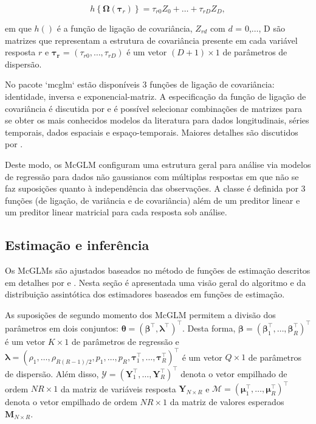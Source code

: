 \documentclass[AMA,STIX1COL]{WileyNJD-v2}
\begin{document}
\begin{equation}
h\left \{ \boldsymbol{\Omega}(\boldsymbol{\tau}_r) \right \} = \tau_{r0}Z_0 + \ldots + \tau_{rD}Z_D,
\end{equation}

em que $h()$ é a função de ligação de covariância, $Z_{rd}$ com $d$ = 0,$\ldots$, D são matrizes que representam a estrutura de covariância presente em cada variável resposta $r$ e $\boldsymbol{\tau_r}$ = $(\tau_{r0}, \ldots, \tau_{rD})$ é um vetor $(D + 1) \times 1$ de parâmetros de dispersão. 

No pacote `mcglm` estão disponíveis 3 funções de ligação de covariância: identidade, inversa e exponencial-matriz. A especificação da função de ligação de covariância é discutida por \citet{Pinheiro96} e é possível selecionar combinações de matrizes para se obter os mais conhecidos modelos da literatura para dados longitudinais, séries temporais, dados espaciais e espaço-temporais. Maiores detalhes são discutidos por \citet{Demidenko13}.

Deste modo, os McGLM configuram uma estrutura geral para análise via modelos de regressão para dados não gaussianos com múltiplas respostas em que não se faz suposições quanto à independência das observações. A classe é definida por 3 funções (de ligação, de variância e de covariância) além de um preditor linear e um preditor linear matricial para cada resposta sob análise. 

\subsection{Estimação e inferência}

Os McGLMs são ajustados baseados no método de funções de estimação descritos em detalhes por \citet{Bonat16} e \citet{jorg04}. Nesta seção é apresentada uma visão geral do algoritmo e da distribuição assintótica dos estimadores baseados em funções de estimação.

As suposições de segundo momento dos McGLM permitem a divisão dos
parâmetros em dois conjuntos: $\boldsymbol{\theta} = (\boldsymbol{\beta}^{\top}, \boldsymbol{\lambda}^{\top})^{\top}$. Desta forma, $\boldsymbol{\beta} = (\boldsymbol{\beta}_1^\top, \ldots, \boldsymbol{\beta}_R^\top)^\top$ é um vetor $K \times 1$ de parâmetros de regressão e $\boldsymbol{\lambda} = (\rho_1, \ldots, \rho_{R(R-1)/2}, p_1, \ldots, p_R, \boldsymbol{\tau}_1^\top, \ldots, \boldsymbol{\tau}_R^\top)^\top$ é um vetor $Q \times 1$ de parâmetros de dispersão. Além disso, $\mathcal{Y} = (\boldsymbol{Y}_1^\top, \ldots, \boldsymbol{Y}_R^\top)^\top$ denota o vetor empilhado de ordem $NR \times 1$ da matriz de variáveis resposta $\boldsymbol{Y}_{N \times R}$ e $\mathcal{M} = (\boldsymbol{\mu}_1^\top, \ldots, \boldsymbol{\mu}_R^\top)^\top$ denota o vetor empilhado de ordem $NR \times 1$ da matriz de valores esperados $\boldsymbol{M}_{N \times R}$.
\end{document}
